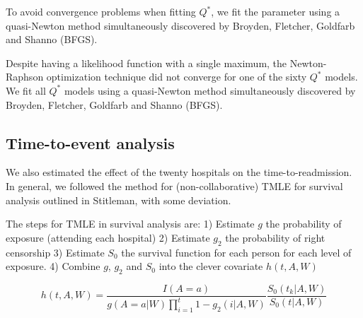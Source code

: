 \documentclass[]{article}\usepackage[]{graphicx}\usepackage[]{color}
\begin{document}
To avoid convergence problems when fitting $Q^*$, we fit the parameter using a quasi-Newton method simultaneously discovered by Broyden\supercite{broyden_convergence_1970}, Fletcher\supercite{fletcher_new_1970}, Goldfarb\supercite{goldfarb_family_1970} and Shanno\supercite{shanno_conditioning_1970} (BFGS).

Despite having a likelihood function with a single maximum, the Newton-Raphson optimization technique did not converge for one of the sixty $Q^*$ models. We fit all $Q^*$ models using a quasi-Newton method simultaneously discovered by Broyden\supercite{broyden_convergence_1970}, Fletcher\supercite{fletcher_new_1970}, Goldfarb\supercite{goldfarb_family_1970} and Shanno\supercite{shanno_conditioning_1970} (BFGS).


\subsection{Time-to-event analysis}
We also estimated the effect of the twenty hospitals on the time-to-readmission. In general, we followed the method for (non-collaborative) TMLE for survival analysis outlined in Stitleman\supercite{stitelman_collaborative_2010}, with some deviation. 

The steps for TMLE in survival analysis are: 1) Estimate $g$ the probability of exposure (attending each hospital) 2) Estimate $g_2$ the probability of right censorship 3) Estimate $S_0$ the survival function for each person for each level of exposure. 4) Combine $g$, $g_2$ and $S_0$ into the clever covariate $h(t,A,W)$ 

\begin{equation}
\label{survival_clever_covariate} 
h(t,A,W)=\frac{I(A=a)}{g(A=a|W)\prod_{i=1}^t1-g_2(i|A,W)}\frac{S_0(t_k|A,W)}{S_0(t|A,W)}
\end{equation}
\end{document}
